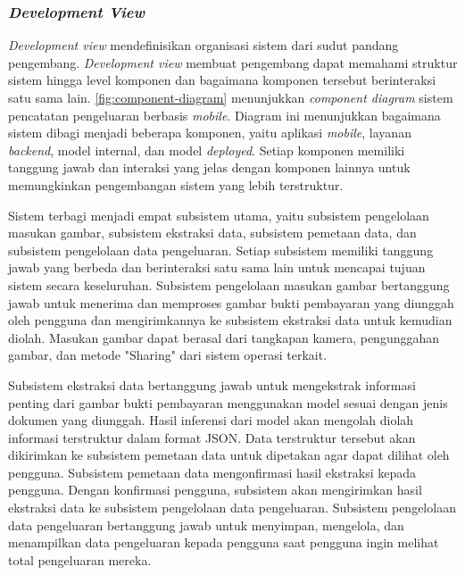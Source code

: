 \subsubsection{\emph{Development View}}
\label{subsubsec:development-view}
\emph{Development view} mendefinisikan organisasi sistem dari sudut pandang pengembang. \emph{Development view} membuat pengembang dapat memahami struktur sistem hingga level komponen dan bagaimana komponen tersebut berinteraksi satu sama lain. \autoref{fig:component-diagram} menunjukkan \emph{component diagram} sistem pencatatan pengeluaran berbasis \emph{mobile}. Diagram ini menunjukkan bagaimana sistem dibagi menjadi beberapa komponen, yaitu aplikasi \emph{mobile}, layanan \emph{backend}, model internal, dan model \emph{deployed}. Setiap komponen memiliki tanggung jawab dan interaksi yang jelas dengan komponen lainnya untuk memungkinkan pengembangan sistem yang lebih terstruktur.

Sistem terbagi menjadi empat subsistem utama, yaitu subsistem pengelolaan masukan gambar, subsistem ekstraksi data, subsistem pemetaan data, dan subsistem pengelolaan data pengeluaran. Setiap subsistem memiliki tanggung jawab yang berbeda dan berinteraksi satu sama lain untuk mencapai tujuan sistem secara keseluruhan. Subsistem pengelolaan masukan gambar bertanggung jawab untuk menerima dan memproses gambar bukti pembayaran yang diunggah oleh pengguna dan mengirimkannya ke subsistem ekstraksi data untuk kemudian diolah. Masukan gambar dapat berasal dari tangkapan kamera, pengunggahan gambar, dan metode "Sharing" dari sistem operasi terkait. 

Subsistem ekstraksi data bertanggung jawab untuk mengekstrak informasi penting dari gambar bukti pembayaran menggunakan model \donut{} sesuai dengan jenis dokumen yang diunggah. Hasil inferensi dari model  akan mengolah diolah informasi terstruktur dalam format JSON. Data terstruktur tersebut akan dikirimkan ke subsistem pemetaan data untuk dipetakan agar dapat dilihat oleh pengguna. Subsistem pemetaan data mengonfirmasi hasil ekstraksi kepada pengguna. Dengan konfirmasi pengguna, subsistem akan mengirimkan hasil ekstraksi data ke subsistem pengelolaan data pengeluaran. Subsistem pengelolaan data pengeluaran bertanggung jawab untuk menyimpan, mengelola, dan menampilkan data pengeluaran kepada pengguna saat pengguna ingin melihat total pengeluaran mereka.


